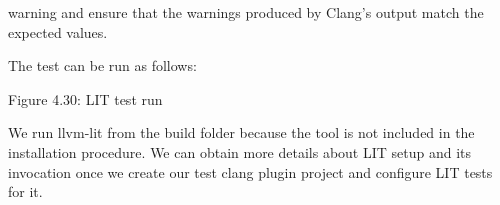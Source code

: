 warning and ensure that the warnings produced by Clang’s output match the expected values.

The test can be run as follows:



\begin{center}
Figure 4.30: LIT test run
\end{center}

We run llvm-lit from the build folder because the tool is not included in the installation procedure. We can obtain more details about LIT setup and its invocation once we create our test clang plugin project and configure LIT tests for it.
















